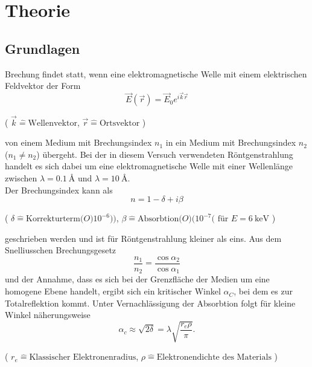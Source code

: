 \section{Theorie}
\subsection{Grundlagen} \label{chap:Grundlagen}
Brechung findet statt, wenn eine elektromagnetische Welle mit einem elektrischen Feldvektor der Form 
\begin{equation}
    \vec{E}(\vec{r}) = \vec{E}_0 e^{i \vec{k} \vec{r} } 
\end{equation}
\begin{center}
    \tiny{( $ \vec{k} \hat{=} \text{Wellenvektor} $, $ \vec{r} \hat{=} \text{Ortsvektor} $ )}
\end{center}
von einem Medium mit Brechungsindex $n_1$ in ein Medium mit Brechungsindex $n_2$ ($n_1 \neq n_2$) übergeht. 
Bei der in diesem Versuch verwendeten Röntgenstrahlung handelt es sich dabei um eine elektromagnetische Welle mit einer Wellenlänge zwischen $\lambda = \SI{0,1}{\angstrom}$ und $\lambda = \SI{10}{\angstrom}$. \\
Der Brechungsindex kann als 
\begin{equation}
    n = 1 - \delta + i\beta
\end{equation}
\begin{center}
    \tiny{( $ \delta \hat{=} \text{Korrekturterm}\mathcal(O)10^{-6})) $, $ \beta \hat{=} \text{Absorbtion}\mathcal(O)(10^{-7} (\text{ für } E = \SI{6}{\kilo \electronvolt}   $ )}
\end{center}
geschrieben werden und ist für Röntgenstrahlung kleiner als eins.
Aus dem Snelliusschen Brechungsgesetz 
\begin{equation}
    \frac{n_1}{n_2} = \frac{\cos{\alpha_2}}{\cos{\alpha_1}}
\end{equation}
und der Annahme, dass es sich bei der Grenzfläche der Medien um eine homogene Ebene handelt, ergibt sich ein kritischer Winkel $\alpha_C$, bei dem es zur Totalreflektion kommt. Unter Vernachlässigung der Absorbtion folgt für kleine Winkel näherungsweise
\begin{equation}
    \alpha_c \approx \sqrt{2 \delta} = \lambda \sqrt{ \frac{r_e \rho}{\pi} } .
\end{equation}
\begin{center}
    \tiny{( $ r_e \hat{=} \text{Klassischer Elektronenradius} $, $ \rho \hat{=} \text{Elektronendichte des Materials}$ )}
\end{center}

